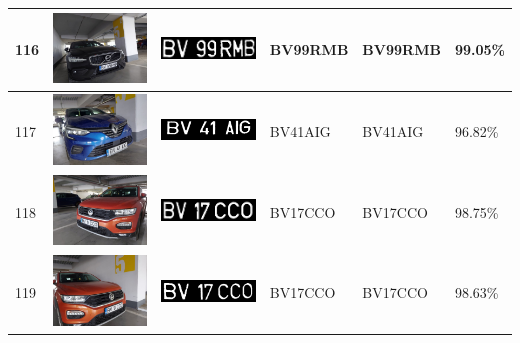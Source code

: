 \documentclass[a4paper,12pt]{report}
\begin{document}
\begin{longtable}{| m{0.6cm} | m{3cm} | m{3cm} | m{1.8cm} | m{1.8cm} | m{1.8cm} |}
    116 & \includegraphics[width=3cm,keepaspectratio]{dataset/67_s1.jpg}  & \includegraphics[width=3cm,keepaspectratio]{segmentari/116.jpg} & BV99RMB             & BV99RMB              & 99.05\%    \\ \hline
    117 & \includegraphics[width=3cm,keepaspectratio]{dataset/68_s1.jpg}  & \includegraphics[width=3cm,keepaspectratio]{segmentari/117.jpg} & BV41AIG             & BV41AIG              & 96.82\%    \\ \hline
    118 & \includegraphics[width=3cm,keepaspectratio]{dataset/69_d1.jpg}  & \includegraphics[width=3cm,keepaspectratio]{segmentari/118.jpg} & BV17CCO             & BV17CCO              & 98.75\%    \\ \hline
    119 & \includegraphics[width=3cm,keepaspectratio]{dataset/69_s1.jpg}  & \includegraphics[width=3cm,keepaspectratio]{segmentari/119.jpg} & BV17CCO             & BV17CCO              & 98.63\%    \\ \hline

\end{longtable}
\end{document}
